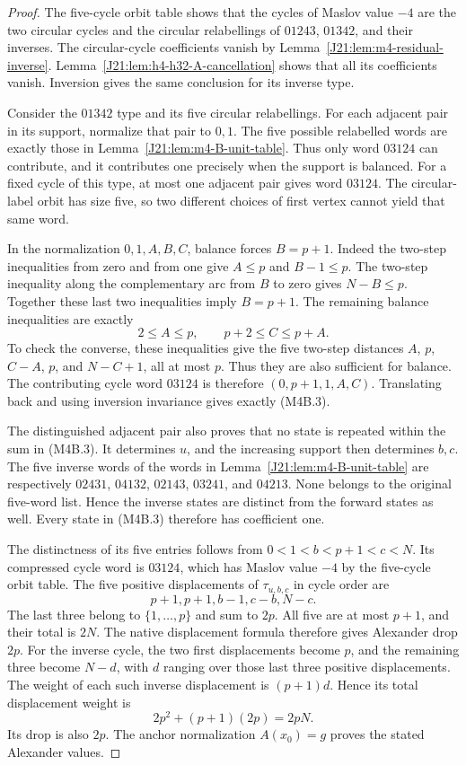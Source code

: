 \documentclass[11pt,oneside]{report}
\theoremstyle{definition}
\numberwithin{equation}{section}
\begin{document}
\begin{proof}
The five-cycle orbit table shows that the cycles of Maslov value $-4$
are the two circular cycles and the circular relabellings of
$01243$, $01342$, and their inverses. The circular-cycle coefficients
vanish by Lemma~\ref{J21:lem:m4-residual-inverse}. Lemma~\ref{J21:lem:h4-h32-A-cancellation} shows that all its coefficients vanish. Inversion
gives the same conclusion for its inverse type.

Consider the $01342$ type and its five circular relabellings. For each
adjacent pair in its support, normalize that pair to $0,1$. The five
possible relabelled words are exactly those in
Lemma~\ref{J21:lem:m4-B-unit-table}. Thus only word $03124$ can contribute,
and it contributes one precisely when the support is balanced.
For a fixed cycle of this type, at most one adjacent pair gives word
$03124$. The circular-label orbit has size five, so two different
choices of first vertex cannot yield that same word.

In the normalization $0,1,A,B,C$, balance forces $B=p+1$.
Indeed the two-step inequalities from zero and from one give
$A\leq p$ and $B-1\leq p$. The two-step inequality along the
complementary arc from $B$ to zero gives $N-B\leq p$.
Together these last two inequalities imply $B=p+1$.
The remaining balance inequalities are exactly
\[
                 2\leq A\leq p,\qquad
                 p+2\leq C\leq p+A.
\]
To check the converse, these inequalities give the five two-step
distances
$A$, $p$, $C-A$, $p$, and $N-C+1$, all at most $p$.
Thus they are also sufficient for balance.
The contributing cycle word $03124$ is therefore
$(0,p+1,1,A,C)$. Translating back and using inversion invariance gives
exactly (M4B.3).

The distinguished adjacent pair also proves that no state is repeated
within the sum in (M4B.3). It determines $u$, and the increasing support
then determines $b,c$. The five inverse words of the words in
Lemma~\ref{J21:lem:m4-B-unit-table} are respectively
$02431$, $04132$, $02143$, $03241$, and $04213$.
None belongs to the original five-word list. Hence the inverse states
are distinct from the forward states as well. Every state in (M4B.3)
therefore has coefficient one.

The distinctness of its five entries follows from
$0<1<b<p+1<c<N$. Its compressed cycle word is $03124$, which has
Maslov value $-4$ by the five-cycle orbit table.
The five positive displacements of $\tau_{u,b,c}$ in cycle order are
\[
                 p+1, p+1, b-1, c-b, N-c.
\]
The last three belong to $\{1,\ldots,p\}$ and sum to $2p$.
All five are at most $p+1$, and their total is $2N$.
The native displacement formula therefore gives Alexander drop $2p$.
For the inverse cycle, the two first displacements become $p$, and
the remaining three become $N-d$, with $d$ ranging over those last
three positive displacements. The weight of each such inverse
displacement is $(p+1)d$. Hence its total displacement weight is
\[
                    2p^2+(p+1)(2p)=2pN.
\]
Its drop is also $2p$. The anchor normalization $A(x_0)=g$ proves the
stated Alexander values.
\end{proof}
\end{document}
